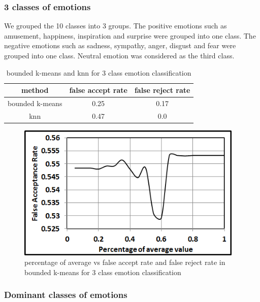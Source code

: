 \subsubsection{3 classes of emotions}
We grouped the 10 classes into 3 groups. The positive emotions such as amusement, happiness, inspiration and surprise were grouped into one class. The negative emotions such as sadness, sympathy, anger, disgust and fear were grouped into one class. Neutral emotion was considered as the third class.


\begin{center}
\begin{table}

\centering
\begin{tabular}{ |c|c|c| } 
 \hline
 method & false accept rate & false reject rate \\ 
 \hline
 bounded k-means & 0.25 & 0.17 \\ 
 knn & 0.47 & 0.0 \\ 
 \hline
\end{tabular}

\caption{bounded k-means and knn for 3 class emotion classification}
\label{table:2}
\end{table}
\end{center}


\begin{figure}
\centering
\includegraphics[width=4.25in,clip,keepaspectratio]{Chapters/figures/Emotion/3class/fA}
\caption{percentage of average vs false accept rate and false reject rate in bounded k-means for 3 class emotion classification}
\label{Optional 6}
\end{figure}


\clearpage
\subsubsection{Dominant classes of emotions}

